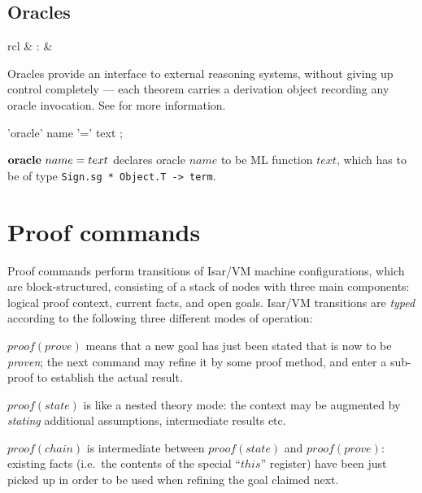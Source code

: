 \subsection{Oracles}

\begin{matharray}{rcl}
   & : &  \\
\end{matharray}

Oracles provide an interface to external reasoning systems, without giving up
control completely --- each theorem carries a derivation object recording any
oracle invocation.  See \cite[\S6]{isabelle-ref} for more information.

\begin{rail}
  'oracle' name '=' text
  ;
\end{rail}

\begin{descr}
\item [${\mathord{\mathbf{oracle}}}~name=text$] declares oracle $name$ to be ML
  function $text$, which has to be of type
  \texttt{Sign.sg~*~Object.T~->~term}.
\end{descr}


\section{Proof commands}

Proof commands perform transitions of Isar/VM machine configurations, which
are block-structured, consisting of a stack of nodes with three main
components: logical proof context, current facts, and open goals.  Isar/VM
transitions are \emph{typed} according to the following three different modes
of operation:
\begin{descr}
\item [$proof(prove)$] means that a new goal has just been stated that is now
  to be \emph{proven}; the next command may refine it by some proof method,
  and enter a sub-proof to establish the actual result.
\item [$proof(state)$] is like a nested theory mode: the context may be
  augmented by \emph{stating} additional assumptions, intermediate results
  etc.
\item [$proof(chain)$] is intermediate between $proof(state)$ and
  $proof(prove)$: existing facts (i.e.\ the contents of the special ``$this$''
  register) have been just picked up in order to be used when refining the
  goal claimed next.
\end{descr}

